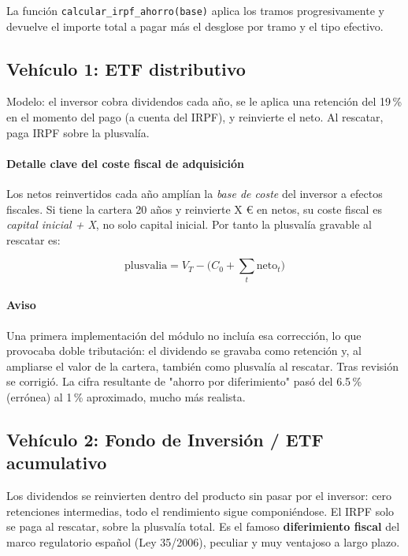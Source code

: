 \documentclass[11pt,a4paper]{article}
\begin{document}
La función \texttt{calcular\_irpf\_ahorro(base)} aplica los tramos progresivamente y devuelve el importe total a pagar más el desglose por tramo y el tipo efectivo.

\subsection{Vehículo 1: ETF distributivo}

Modelo: el inversor cobra dividendos cada año, se le aplica una retención del 19\,\% en el momento del pago (a cuenta del IRPF), y reinvierte el neto. Al rescatar, paga IRPF sobre la plusvalía.

\paragraph{Detalle clave del coste fiscal de adquisición}
Los netos reinvertidos cada año amplían la \textit{base de coste} del inversor a efectos fiscales. Si tiene la cartera 20 años y reinvierte X € en netos, su coste fiscal es \textit{capital inicial + X}, no solo capital inicial. Por tanto la plusvalía gravable al rescatar es:

\begin{equation}
\mathrm{plusvalia} = V_T - \big(C_0 + \textstyle\sum_t \text{neto}_t\big)
\end{equation}

\paragraph{Aviso}
Una primera implementación del módulo no incluía esa corrección, lo que provocaba doble tributación: el dividendo se gravaba como retención y, al ampliarse el valor de la cartera, también como plusvalía al rescatar. Tras revisión se corrigió. La cifra resultante de "ahorro por diferimiento" pasó del 6.5\,\% (errónea) al 1\,\% aproximado, mucho más realista.

\subsection{Vehículo 2: Fondo de Inversión / ETF acumulativo}

Los dividendos se reinvierten dentro del producto sin pasar por el inversor: cero retenciones intermedias, todo el rendimiento sigue componiéndose. El IRPF solo se paga al rescatar, sobre la plusvalía total. Es el famoso \textbf{diferimiento fiscal} del marco regulatorio español (Ley 35/2006), peculiar y muy ventajoso a largo plazo.
\end{document}

